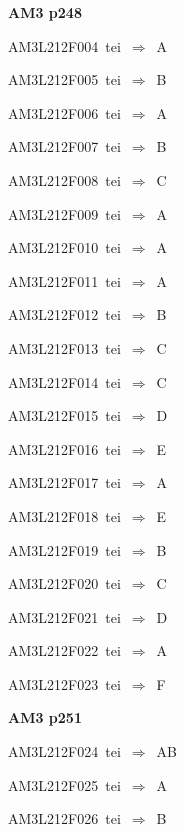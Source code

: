 \par\vfill\eject
{\bf\hfill AM3 p248\hfill\hbox{}}\par\bigskip
{\sixrm AM3L212F004\ {\sixit tei}\ }$\Rightarrow$\ A\par\smallskip
{\sixrm AM3L212F005\ {\sixit tei}\ }$\Rightarrow$\ B\par\smallskip
{\sixrm AM3L212F006\ {\sixit tei}\ }$\Rightarrow$\ A\par\smallskip
{\sixrm AM3L212F007\ {\sixit tei}\ }$\Rightarrow$\ B\par\smallskip
{\sixrm AM3L212F008\ {\sixit tei}\ }$\Rightarrow$\ C\par\smallskip
{\sixrm AM3L212F009\ {\sixit tei}\ }$\Rightarrow$\ A\par\smallskip
{\sixrm AM3L212F010\ {\sixit tei}\ }$\Rightarrow$\ A\par\smallskip
{\sixrm AM3L212F011\ {\sixit tei}\ }$\Rightarrow$\ A\par\smallskip
{\sixrm AM3L212F012\ {\sixit tei}\ }$\Rightarrow$\ B\par\smallskip
{\sixrm AM3L212F013\ {\sixit tei}\ }$\Rightarrow$\ C\par\smallskip
{\sixrm AM3L212F014\ {\sixit tei}\ }$\Rightarrow$\ C\par\smallskip
{\sixrm AM3L212F015\ {\sixit tei}\ }$\Rightarrow$\ D\par\smallskip
{\sixrm AM3L212F016\ {\sixit tei}\ }$\Rightarrow$\ E\par\smallskip
{\sixrm AM3L212F017\ {\sixit tei}\ }$\Rightarrow$\ A\par\smallskip
{\sixrm AM3L212F018\ {\sixit tei}\ }$\Rightarrow$\ E\par\smallskip
{\sixrm AM3L212F019\ {\sixit tei}\ }$\Rightarrow$\ B\par\smallskip
{\sixrm AM3L212F020\ {\sixit tei}\ }$\Rightarrow$\ C\par\smallskip
{\sixrm AM3L212F021\ {\sixit tei}\ }$\Rightarrow$\ D\par\smallskip
{\sixrm AM3L212F022\ {\sixit tei}\ }$\Rightarrow$\ A\par\smallskip
{\sixrm AM3L212F023\ {\sixit tei}\ }$\Rightarrow$\ F\par\smallskip

\par\vfill\eject
{\bf\hfill AM3 p251\hfill\hbox{}}\par\bigskip
{\sixrm AM3L212F024\ {\sixit tei}\ }$\Rightarrow$\ AB\par\smallskip
{\sixrm AM3L212F025\ {\sixit tei}\ }$\Rightarrow$\ A\par\smallskip
{\sixrm AM3L212F026\ {\sixit tei}\ }$\Rightarrow$\ B\par\smallskip

